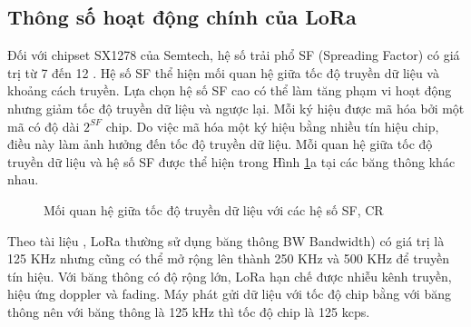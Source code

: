 \subsection{Thông số hoạt động chính của LoRa}
Đối với chipset SX1278 của Semtech, hệ số trải phổ SF (Spreading Factor) có giá trị từ 7 đến 12 \cite{5}. Hệ số SF thể hiện mối quan hệ giữa tốc độ truyền dữ liệu và khoảng cách truyền. Lựa chọn hệ số SF cao có thể làm tăng phạm vi hoạt động nhưng giảm tốc độ truyền dữ liệu và ngược lại. Mỗi ký hiệu được mã hóa bởi một mã có độ dài $2^{SF}$ chip. Do việc mã hóa một ký hiệu bằng nhiều tín hiệu chip, điều này làm ảnh hưởng đến tốc độ truyền dữ liệu. Mỗi quan hệ giữa tốc độ truyền dữ liệu và hệ số SF được thể hiện trong Hình \ref{refhinh2_4}{}a tại các băng thông khác nhau.\\
\begin{figure}[h]
\centering
{}\hfill
{}
\caption{Mối quan hệ giữa tốc độ truyền dữ liệu với các hệ số SF, CR \cite{5}}
\label{refhinh2_4}
\end{figure}
\par 
Theo tài liệu \cite{5}, LoRa thường sử dụng băng thông BW  Bandwidth) có giá trị là 125 KHz nhưng cũng có thể mở rộng lên thành 250 KHz và 500 KHz để truyền tín hiệu. Với băng thông có độ rộng lớn, LoRa hạn chế được nhiễu kênh truyền, hiệu ứng doppler và fading. Máy phát gửi dữ liệu với tốc độ chip bằng với băng thông nên với băng thông là 125 kHz thì tốc độ chip là 125 kcps.
